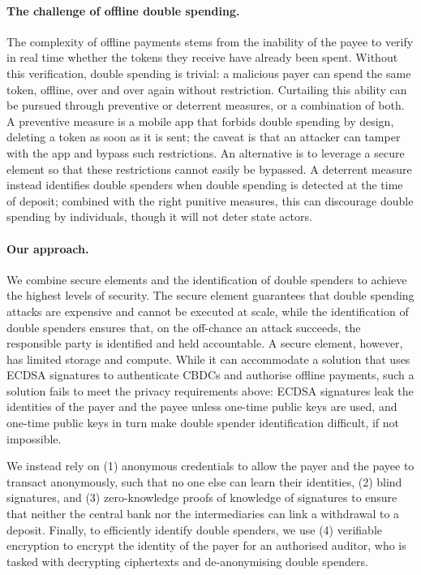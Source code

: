 \paragraph{The challenge of offline double spending.} The complexity of
offline payments stems from the inability of the payee to verify in real time
whether the tokens they receive have already been spent. Without this
verification, double spending is trivial: a malicious payer can spend the same
token, offline, over and over again without restriction. Curtailing this
ability can be pursued through preventive or deterrent measures,
or a combination of both. A preventive measure is a mobile app that forbids
double spending by design, deleting a token as soon as it is sent; the caveat
is that an attacker can tamper with the app and bypass such restrictions. An
alternative is to leverage a secure element so that these restrictions
cannot easily be bypassed. A deterrent measure instead identifies double
spenders when double spending is detected at the time of deposit; combined
with the right punitive measures, this can discourage double spending by
individuals, though it will not deter state actors.

\paragraph{Our approach.} We combine secure elements and the identification of
double spenders to achieve the highest levels of security. The secure element
guarantees that double spending attacks are expensive and cannot be executed
at scale, while the identification of double spenders ensures that, on the
off-chance an attack succeeds, the responsible party is identified and held
accountable. A secure element, however, has limited storage and compute. While
it can accommodate a solution that uses ECDSA signatures to authenticate
CBDCs and authorise offline payments, such a solution fails to meet the
privacy requirements above: ECDSA signatures leak the identities of the payer
and the payee unless one-time public keys are used, and one-time public keys
in turn make double spender identification difficult, if not impossible.

We instead rely on (1) anonymous credentials to allow the payer and
the payee to transact anonymously, such that no one else can learn their
identities, (2) blind signatures, and (3) zero-knowledge
proofs of knowledge of signatures to ensure that neither the central bank nor
the intermediaries can link a withdrawal to a deposit. Finally, to
efficiently identify double spenders, we use (4) verifiable
encryption to encrypt the identity of the payer for an authorised auditor,
who is tasked with decrypting ciphertexts and de-anonymising double spenders.

